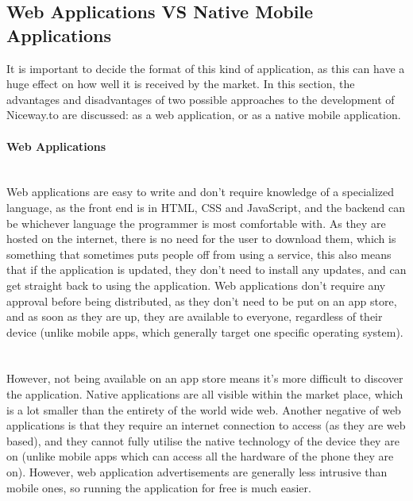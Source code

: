 \documentclass[a4paper,twoside,notitlepage,11pt]{article}
\begin{document}
\subsection{Web Applications VS Native Mobile Applications}
It is important to decide the format of this kind of application, as this can have a huge effect on how well it is received by the market. In this section, the advantages and disadvantages of two possible approaches to the development of Niceway.to are discussed: as a web application, or as a native mobile application.

\paragraph{Web Applications}\ \\
Web applications are easy to write and don't require knowledge of a specialized language, as the front end is in HTML, CSS and JavaScript, and the backend can be whichever language the programmer is most comfortable with. As they are hosted on the internet, there is no need for the user to download them, which is something that sometimes puts people off from using a service, this also means that if the application is updated, they don't need to install any updates, and can get straight back to using the application. Web applications don't require any approval before being distributed, as they don't need to be put on an app store, and as soon as they are up, they are available to everyone, regardless of their device (unlike mobile apps, which generally target one specific operating system). \ \\
\ \\
However, not being available on an app store means it's more difficult to discover the application. Native applications are all visible within the market place, which is a lot smaller than the entirety of the world wide web. Another negative of web applications is that they require an internet connection to access (as they are web based), and they cannot fully utilise the native technology of the device they are on (unlike mobile apps which can access all the hardware of the phone they are on). However, web application advertisements are generally less intrusive than mobile ones, so running the application for free is much easier.
\end{document}
